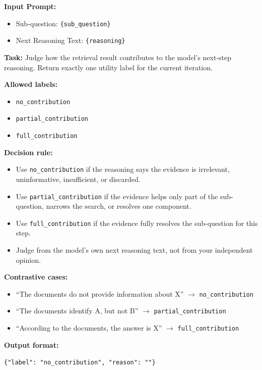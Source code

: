 \documentclass{article} %
\begin{document}
\newpage
\begin{tcolorbox}[
  title=Example: Iteration Utility Annotation Prompt,
  coltitle=black,
  colbacktitle=blue!8,
  colback=blue!5,
  colframe=black,
  fonttitle=\bfseries,
  arc=2mm,
  boxrule=0.5pt,
  enhanced jigsaw,
  breakable,
  width=\linewidth,
  left=6pt,
  right=6pt,
  top=6pt,
  bottom=6pt
]

\textbf{Input Prompt:}

\begin{itemize}
  \item Sub-question: \texttt{\{sub\_question\}}
  \item Next Reasoning Text: \texttt{\{reasoning\}}
\end{itemize}

\textbf{Task:}
Judge how the retrieval result contributes to the model's next-step reasoning.
Return exactly one utility label for the current iteration.

\textbf{Allowed labels:}
\begin{itemize}
  \item \texttt{no\_contribution}
  \item \texttt{partial\_contribution}
  \item \texttt{full\_contribution}
\end{itemize}

\textbf{Decision rule:}
\begin{itemize}
  \item Use \texttt{no\_contribution} if the reasoning says the evidence is irrelevant, uninformative, insufficient, or discarded.
  \item Use \texttt{partial\_contribution} if the evidence helps only part of the sub-question, narrows the search, or resolves one component.
  \item Use \texttt{full\_contribution} if the evidence fully resolves the sub-question for this step.
  \item Judge from the model's own next reasoning text, not from your independent opinion.
\end{itemize}

\textbf{Contrastive cases:}
\begin{itemize}
  \item ``The documents do not provide information about X'' $\rightarrow$ \texttt{no\_contribution}
  \item ``The documents identify A, but not B'' $\rightarrow$ \texttt{partial\_contribution}
  \item ``According to the documents, the answer is X'' $\rightarrow$ \texttt{full\_contribution}
\end{itemize}

\textbf{Output format:}

\verb|{"label": "no_contribution", "reason": ""}|
\end{tcolorbox}
\end{document}
